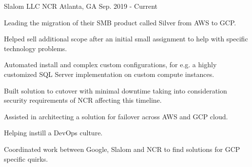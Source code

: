 

\begin{cventries}

\cventry
{Slalom LLC} %
{NCR} %
{Atlanta, GA} %
{Sep. 2019 - Current} %
{
  \begin{cvitems} %
    \item {Leading the migration of their SMB product called Silver from AWS to GCP.}
    \item {Helped sell additional scope after an initial small assignment to help with specific technology problems.}
    \item {Automated install and complex custom configurations, for e.g. a highly customized SQL Server implementation on custom compute instances.}
    \item {Built solution to cutover with minimal downtime taking into consideration security requirements of NCR affecting this timeline.}
    \item {Assisted in architecting a solution for failover across AWS and GCP cloud.}
    \item {Helping instill a DevOps culture.}
    \item {Coordinated work between Google, Slalom and NCR to find solutions for GCP specific quirks.}
  \end{cvitems}
}


\end{cventries}
